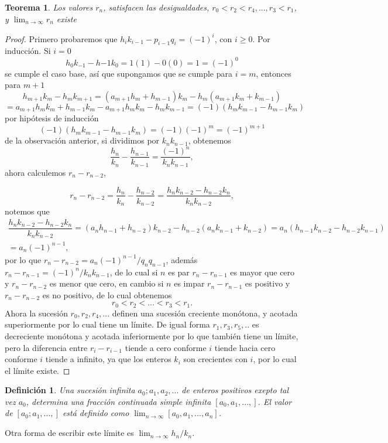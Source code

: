 \documentclass[11pt, article]{article}
\newtheorem{theorem}{Teorema} %
\newtheorem{definition}{Definición}
\begin{document}
    \begin{theorem}
    Los valores $r_n$, satisfacen las desigualdades, $r_0<r_2<r_4,...,r_3<r_1$, y $\displaystyle\lim_{n\to\infty}r_n$ existe 
    \end{theorem}
    \begin{proof}
        Primero probaremos que $h_ik_{i-1}-p_{i-1}q_{i}=(-1)^i$, con $i\geq 0$.
    Por inducción. Si $i=0$
        \[ 
        h_0k_{-1}-h{-1}k_0=1(1)-0(0)=1=(-1)^0
        \]
    se cumple el caso base, así que supongamos que se cumple para $i=m$, entonces para $m+1$
    \[
    h_{m+1}k_{m}-h_{m}k_{m+1}=(a_{m+1}h_{m} + h_{m-1})k_m-h_m(a_{m+1}k_m+k_{m-1})
    \]
    \[
    =a_{m+1}h_mk_m+h_{m-1}k_m-a_{m+1}h_mk_m-h_mk_{m-1}
    =(-1)(h_mk_{m-1}-h_{m-1}k_m)
    \]
    por hipótesis de inducción 
        \[
        (-1)(h_m k_{m-1}-h_{m-1}k_m)=(-1)(-1)^m=(-1)^{m+1}
        \]
    de la observación anterior, si dividimos por $k_nk_{n-1}$, obtenemos 
        \[
        \dfrac{h_n}{k_n}-\dfrac{h_{n-1}}{k_{n-1}}=\dfrac{(-1)^n}{k_nk_{n-1}},
        \]
    ahora calculemos $r_n-r_{n-2}$,
    
        \[
        r_n-r_{n-2}=\dfrac{h_n}{k_n}-\dfrac{h_{n-2}}{k_{n-2}}=\dfrac{h_nk_{n-2}-h_{n-2}k_n}{k_nk_{n-2}},
        \]
        notemos que 
        \begin{align*}
        \dfrac{h_nk_{n-2}-h_{n-2}k_n}{k_nk_{n-2}}= (a_n h_{n-1}+h_{n-2})k_{n-2}-h_{n-2}(a_n k_{n-1}+k_{n-2})= a_n(h_{n-1}k_{n-2}-h_{n-2}k_{n-1})\\=a_n(-1)^{n-1},
        \end{align*}
    por lo que $r_n-r_{n-2}=a_n(-1)^{n-1}/q_nq_{n-1}$, además $r_n-r_{n-1}=(-1)^n/k_nk_{n-1}$, de lo cual si $n$ es par $r_n-r_{n-1}$ es mayor que cero y $r_n-r_{n-2}$ es menor que cero, en cambio si $n$ es impar $r_n-r_{n-1}$ es positivo y $r_n-r_{n-2}$ es no positivo, de lo cual obtenemos
    \[
    r_0<r_2<...<r_3<r_1.
    \]
    Ahora la sucesión $r_0,r_2,r_4,...$ definen una sucesión creciente monótona, y acotada superiormente por lo cual tiene un límite. De igual forma $r_1,r_3,r_5,..$ es decreciente monótona y acotada inferiormente por lo que también tiene un límite, pero la diferencia entre $r_i-r_{i-1}$ tiende a cero conforme $i$ tiende hacia cero conforme $i$ tiende a infinito, ya que los enteros $k_i$ son crecientes con $i$, por lo cual el límite existe. 
    \end{proof}
    \begin{definition}
    Una sucesión infinita $a_0; a_1, a_2,...$ de enteros positivos exepto tal vez $a_0$, determina una fracción continuada simple infinita $[a_0, a_1, ..., ]$. El valor de $[a_0; a_1, ..., ]$ está definido como $\displaystyle\lim_{n\to\infty}[a_0, a_1, ..., a_n]$.
    \end{definition}  
    Otra forma de escribir este límite es $\lim_{n\to\infty} h_n/k_n$. 
\end{document}
